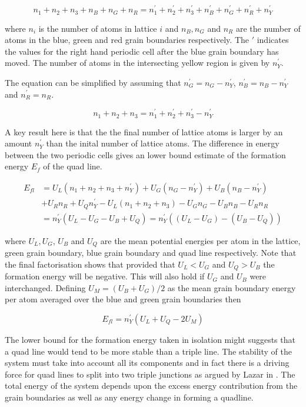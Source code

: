 \documentclass[12pt,a4paper]{book}
\begin{document}
\[ n_1 + n_2 + n_3 + n_B + n_G + n_R = n_1^{\prime} + n_2^{\prime} + n_3^{\prime} + n_B^{\prime} + n_G^{\prime} + n_R^{\prime} +
n_Y^{\prime} \]

where $n_i$ is the number of atoms in lattice $i$ and $n_B, n_G$ and $n_R$ are the number of atoms in the blue, green and red grain boundaries respectively. The $\prime$ indicates the values for the right hand periodic cell after the blue grain boundary has moved.  The number of atoms in the intersecting yellow region is given by $n_Y^{\prime}$.

The equation can be simplified by assuming that $n_G^{\prime} = n_G-n_Y^{\prime}$, $n_B^{\prime} = n_B-n_Y^{\prime}$ and $n_R^{\prime} = n_R$. 

\[ n_1 + n_2 + n_3   = n_1^{\prime} + n_2^{\prime} + n_3^{\prime}- n_Y^{\prime} \]

A key result here is that the the final number of lattice atoms is larger by an amount $n_Y^{\prime}$ than the inital number of lattice atoms. The difference in energy between the two periodic cells gives an lower bound estimate of the formation energy $E_f$ of the quad line.

\begin{align*}
 E_{fl} &= U_L(n_1+n_2+n_3+n_Y^{\prime}) + U_G(n_G - n_Y^{\prime})
+ U_B(n_B - n_Y^{\prime}) \\ 
&+ U_R n_R + U_Q n_Y^{\prime}
- U_L(n_1+n_2+n_3) - U_G n_G - U_B n_B - U_R n_R  
\\ 
&=  n_Y^{\prime}(U_L - U_G - U_B + U_Q) = n_Y^{\prime}((U_L - U_G) - (U_B - U_Q)) 
\end{align*}

where $U_L, U_G$, $U_B$ and $U_Q$ are the mean potential energies per atom in the lattice, green grain boundary, blue grain boundary
and quad line respectively. Note that the final factorisation shows that provided that $U_L < U_G$ and $U_Q > U_B$ the formation energy will be negative. This will also hold if $U_G$ and $U_B$ were interchanged. Defining $U_M = (U_B + U_G)/2$ as the mean grain boundary energy per atom averaged over the blue and green grain boundaries then

\[E_{fl} =  n_Y^{\prime}(U_L + U_Q - 2U_M)\]

The lower bound for the formation energy taken in isolation might suggests that a quad line would tend to be more stable than a triple line. The stability of the system must take into account all its components and in fact there is a driving force for quad lines to split into two triple junctions as argued by Lazar in \cite{Lazar2011}. The total energy of the system depends upon the excess energy contribution from the grain boundaries as well as any energy change in forming a quadline.
\end{document}
